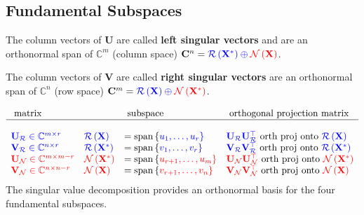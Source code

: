 \documentclass[14pt]{article}
\theoremstyle{definition}
\theoremstyle{remark}
\begin{document}
\subsection*{Fundamental Subspaces}
The column vectors of $\mathbf{U}$ are called \textbf{left singular vectors} and are an orthonormal span of
$\mathbb{C}^m$ (column space) $\mathbf{C}^{n} =
    \color{blue}{\mathcal{R} \left( \mathbf{X}^{*} \right)} \oplus
    \color{red}{\mathcal{N} \left( \mathbf{X} \right)}$.

The column vectors of $\mathbf{V}$ are called \textbf{right singular vectors}
are an orthonormal span of $\mathbb{C}^n$ (row space) $ \mathbf{C}^{m} =
    \color{blue}{\mathcal{R} \left( \mathbf{X} \right)} \oplus
    \color{red} {\mathcal{N} \left( \mathbf{X}^{*} \right)}$.

$$
    \begin{array}{llll}
        \text{ matrix }   &                                                       & \text{ subspace }  & \text{ orthogonal projection matrix } \\
        \hline\\
        \color{blue}{\mathbf{U}_{\mathcal{R}}}\in\mathbb{C}^{m\times r}  &
        \color{blue}{\mathcal{R}\left(\mathbf{X}\right)}                 & =
        \text{span}\left\{\color{blue}{u_{1}},\dots,\color{blue}{u_{r}}\right\}
        &  {\color{blue}\mathbf{U}_{\mathcal{R}}} {\color{blue}\mathbf{U}_{\mathcal{R}}^\top}  \text{ orth proj onto }  {\color{blue}\mathcal{R}\left(\mathbf{X}\right)}  \\
        \color{blue}{\mathbf{V}_{\mathcal{R}}}\in\mathbb{C}^{n\times r}  &
        \color{blue}{\mathcal{R}\left(\mathbf{X}^{*}\right)}             & =
        \text{span}\left\{\color{blue}{v_{1}},\dots,\color{blue}{v_{r}}\right\}   
        &  {\color{blue}\mathbf{V}_{\mathcal{R}}} {\color{blue}\mathbf{V}_{\mathcal{R}}^\top}  \text{ orth proj onto }  {\color{blue}\mathcal{R}\left(\mathbf{X}^*\right)}  \\
        \color{red}{\mathbf{U}_{\mathcal{N}}}\in\mathbb{C}^{m\times m-r} &
        \color{red}{\mathcal{N}\left(\mathbf{X^{*}}\right)}              & =
        \text{span}\left\{\color{red}{u_{r+1}},\dots,\color{red}{u_{m}}\right\} 
        &  {\color{red}\mathbf{U}_{\mathcal{N}}} {\color{red}\mathbf{U}_{\mathcal{N}}^\top}  \text{ orth proj onto }  {\color{red}\mathcal{N}\left(\mathbf{X^{*}}\right)}     \\
        \color{red}{\mathbf{V}_{\mathcal{N}}}\in\mathbb{C}^{n\times n-r} &
        \color{red}{\mathcal{N}\left(\mathbf{X}\right)}                  & =
        \text{span}\left\{\color{red}{v_{r+1}},\dots,\color{red}{v_{n}}\right\}  
        &  {\color{red}\mathbf{V}_{\mathcal{N}}}{\color{red}\mathbf{V}_{\mathcal{N}}^\top}  \text{ orth proj onto }  {\color{red}\mathcal{N}\left(\mathbf{X}\right)}   \\
    \end{array}
$$
The singular value decomposition provides an orthonormal basis for the four fundamental subspaces.
\end{document}
